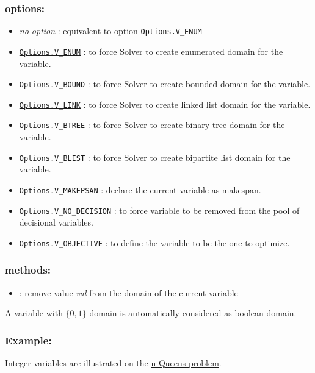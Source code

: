 \subsubsection{options:}
	\begin{itemize}
		\item \emph{no option} : equivalent to option \hyperlink{venum:venumoptions}{\tt Options.V\_ENUM}
		\item \hyperlink{venum:venumoptions}{\tt Options.V\_ENUM} : to force Solver to create enumerated domain for the variable.
		\item \hyperlink{vbound:vboundoptions}{\tt Options.V\_BOUND} : to force Solver to create bounded domain for the variable.
		\item \hyperlink{vlink:vlinkoptions}{\tt Options.V\_LINK} : to force Solver to create linked list domain for the variable.
		\item \hyperlink{vbtree:vbtreeoptions}{\tt Options.V\_BTREE} : to force Solver to create binary tree domain for the variable.
		\item \hyperlink{vblist:vblistoptions}{\tt Options.V\_BLIST} : to force Solver to create bipartite list domain for the variable.
		\item \hyperlink{vmakespan:vmakespanoptions}{\tt Options.V\_MAKEPSAN} : declare the current variable as makespan.
		\item \hyperlink{vnodecision:vnodecisionoptions}{\tt Options.V\_NO\_DECISION} : to force variable to be removed from the pool of decisional variables.
		\item \hyperlink{vobjective:vobjectiveoptions}{\tt Options.V\_OBJECTIVE} : to define the variable to be the one to optimize.
	\end{itemize}
\subsubsection{methods:}
      \begin{itemize}
      \item {}: remove value \emph{val} from the domain of the current variable
      \end{itemize}

A variable with $\{0,1\}$ domain is automatically considered as boolean domain.

\subsubsection{Example:}


Integer variables are illustrated on the \hyperlink{model:example1:nqueenschoco}{n-Queens problem}. 
